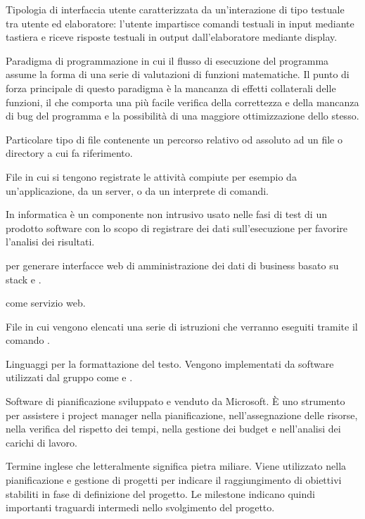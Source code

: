 Tipologia di interfaccia utente caratterizzata da un'interazione di tipo testuale tra utente ed elaboratore: l'utente impartisce comandi testuali in input mediante tastiera e riceve risposte testuali in output dall'elaboratore mediante display.

Paradigma di programmazione in cui il flusso di esecuzione del programma assume la forma di una serie di valutazioni di funzioni matematiche. Il punto di forza principale di questo paradigma è la mancanza di effetti collaterali delle funzioni, il che comporta una più facile verifica della correttezza e della mancanza di bug del programma e la possibilità di una maggiore ottimizzazione dello stesso.

Particolare tipo di file contenente un percorso relativo od assoluto ad un file o directory a cui fa riferimento.

File in cui si tengono registrate le attività compiute per esempio da un'applicazione, da un server, o da un interprete di comandi.

In informatica è un componente non intrusivo usato nelle fasi di test di un prodotto software con lo scopo di registrare dei dati sull'esecuzione per favorire l'analisi dei risultati.


 per generare interfacce web di amministrazione dei dati di business basato su stack  e .

\ProjectName{} come servizio web.

File in cui vengono elencati una serie di istruzioni che verranno eseguiti tramite il comando .

Linguaggi per la formattazione del testo. Vengono implementati da software utilizzati dal gruppo come  e .

Software di pianificazione sviluppato e venduto da Microsoft. È  uno strumento per assistere i project manager nella pianificazione, nell'assegnazione delle risorse, nella verifica del rispetto dei tempi, nella gestione dei budget e nell'analisi dei carichi di lavoro.

Termine inglese che letteralmente significa pietra miliare. Viene utilizzato nella pianificazione e gestione di progetti per indicare il raggiungimento di obiettivi stabiliti in fase di definizione del progetto. 
Le milestone indicano quindi importanti traguardi intermedi nello svolgimento del progetto.

